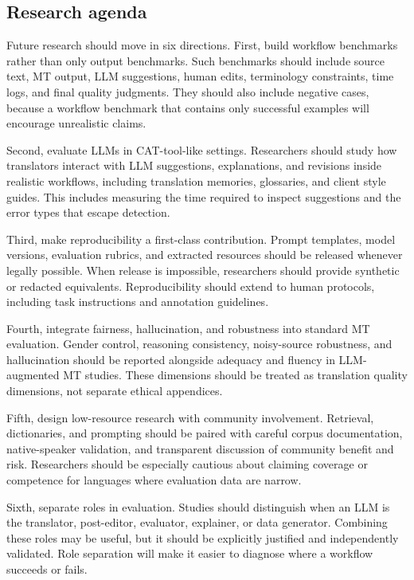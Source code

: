 \documentclass[11pt]{article}
\begin{document}
\subsection{Research agenda}
Future research should move in six directions. First, build workflow benchmarks rather than only output benchmarks. Such benchmarks should include source text, MT output, LLM suggestions, human edits, terminology constraints, time logs, and final quality judgments. They should also include negative cases, because a workflow benchmark that contains only successful examples will encourage unrealistic claims.

Second, evaluate LLMs in CAT-tool-like settings. Researchers should study how translators interact with LLM suggestions, explanations, and revisions inside realistic workflows, including translation memories, glossaries, and client style guides. This includes measuring the time required to inspect suggestions and the error types that escape detection.

Third, make reproducibility a first-class contribution. Prompt templates, model versions, evaluation rubrics, and extracted resources should be released whenever legally possible. When release is impossible, researchers should provide synthetic or redacted equivalents. Reproducibility should extend to human protocols, including task instructions and annotation guidelines.

Fourth, integrate fairness, hallucination, and robustness into standard MT evaluation. Gender control, reasoning consistency, noisy-source robustness, and hallucination should be reported alongside adequacy and fluency in LLM-augmented MT studies. These dimensions should be treated as translation quality dimensions, not separate ethical appendices.

Fifth, design low-resource research with community involvement. Retrieval, dictionaries, and prompting should be paired with careful corpus documentation, native-speaker validation, and transparent discussion of community benefit and risk. Researchers should be especially cautious about claiming coverage or competence for languages where evaluation data are narrow.

Sixth, separate roles in evaluation. Studies should distinguish when an LLM is the translator, post-editor, evaluator, explainer, or data generator. Combining these roles may be useful, but it should be explicitly justified and independently validated. Role separation will make it easier to diagnose where a workflow succeeds or fails.
\end{document}
